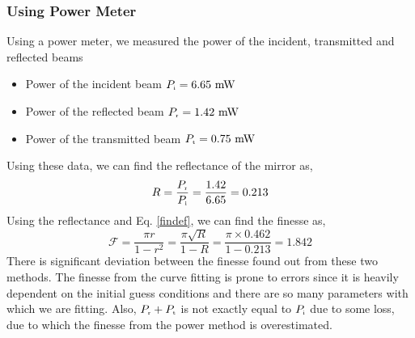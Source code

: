 \subsubsection{Using Power Meter}
Using a power meter, we measured the power of the incident, transmitted and reflected beams
\begin{itemize}
    \item Power of the incident beam $P_{\text{\tiny i}} = 6.65\ \mathrm{mW}$
    \item Power of the reflected beam $P_{\text{\tiny r}}=1.42\ \mathrm{mW}$
    \item Power of the transmitted beam $P_{\text{\tiny t}}=0.75\ \mathrm{mW}$
\end{itemize}
Using these data, we can find the reflectance of the mirror as,
$$R = \frac{P_{\text{\tiny r}}}{P_{\text{\tiny i}}} = \frac{1.42}{6.65} = 0.213$$
Using the reflectance and Eq. \ref{findef}, we can find the finesse as,
$$\mathscr{F} = \frac{\pi r}{1-r^2} = \frac{\pi \sqrt{R}}{1-R} = \frac{\pi \times 0.462 }{1-0.213} = 1.842$$
There is significant deviation between the finesse found out from these two methods. The finesse from the curve fitting is prone to errors since it is heavily dependent on the initial guess conditions and there are so many parameters with which we are fitting. Also, $P_{\text{\tiny r}}+P_{\text{\tiny t}}$ is not exactly equal to $P_{\text{\tiny i}}$ due to some loss, due to which the finesse from the power method is overestimated.


